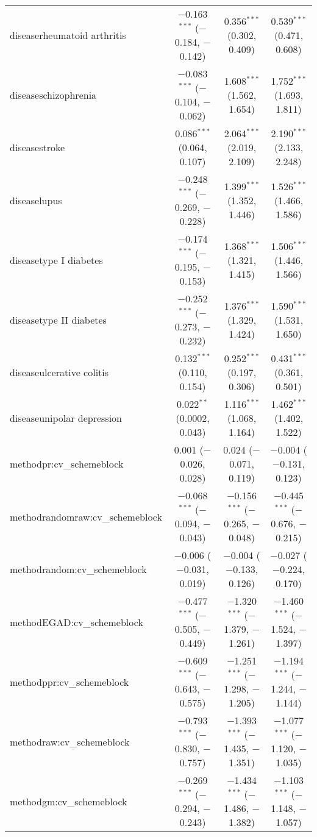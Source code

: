 \begin{table}[!htbp]
\begin{tabular}{@{\extracolsep{5pt}}lccc}
  diseaserheumatoid arthritis & $-$0.163$^{***}$ ($-$0.184, $-$0.142) & 0.356$^{***}$ (0.302, 0.409) & 0.539$^{***}$ (0.471, 0.608) \\ 
  diseaseschizophrenia & $-$0.083$^{***}$ ($-$0.104, $-$0.062) & 1.608$^{***}$ (1.562, 1.654) & 1.752$^{***}$ (1.693, 1.811) \\ 
  diseasestroke & 0.086$^{***}$ (0.064, 0.107) & 2.064$^{***}$ (2.019, 2.109) & 2.190$^{***}$ (2.133, 2.248) \\ 
  diseaselupus & $-$0.248$^{***}$ ($-$0.269, $-$0.228) & 1.399$^{***}$ (1.352, 1.446) & 1.526$^{***}$ (1.466, 1.586) \\ 
  diseasetype I diabetes & $-$0.174$^{***}$ ($-$0.195, $-$0.153) & 1.368$^{***}$ (1.321, 1.415) & 1.506$^{***}$ (1.446, 1.566) \\ 
  diseasetype II diabetes & $-$0.252$^{***}$ ($-$0.273, $-$0.232) & 1.376$^{***}$ (1.329, 1.424) & 1.590$^{***}$ (1.531, 1.650) \\ 
  diseaseulcerative colitis & 0.132$^{***}$ (0.110, 0.154) & 0.252$^{***}$ (0.197, 0.306) & 0.431$^{***}$ (0.361, 0.501) \\ 
  diseaseunipolar depression & 0.022$^{**}$ (0.0002, 0.043) & 1.116$^{***}$ (1.068, 1.164) & 1.462$^{***}$ (1.402, 1.522) \\ 
  methodpr:cv\_schemeblock & 0.001 ($-$0.026, 0.028) & 0.024 ($-$0.071, 0.119) & $-$0.004 ($-$0.131, 0.123) \\ 
  methodrandomraw:cv\_schemeblock & $-$0.068$^{***}$ ($-$0.094, $-$0.043) & $-$0.156$^{***}$ ($-$0.265, $-$0.048) & $-$0.445$^{***}$ ($-$0.676, $-$0.215) \\ 
  methodrandom:cv\_schemeblock & $-$0.006 ($-$0.031, 0.019) & $-$0.004 ($-$0.133, 0.126) & $-$0.027 ($-$0.224, 0.170) \\ 
  methodEGAD:cv\_schemeblock & $-$0.477$^{***}$ ($-$0.505, $-$0.449) & $-$1.320$^{***}$ ($-$1.379, $-$1.261) & $-$1.460$^{***}$ ($-$1.524, $-$1.397) \\ 
  methodppr:cv\_schemeblock & $-$0.609$^{***}$ ($-$0.643, $-$0.575) & $-$1.251$^{***}$ ($-$1.298, $-$1.205) & $-$1.194$^{***}$ ($-$1.244, $-$1.144) \\ 
  methodraw:cv\_schemeblock & $-$0.793$^{***}$ ($-$0.830, $-$0.757) & $-$1.393$^{***}$ ($-$1.435, $-$1.351) & $-$1.077$^{***}$ ($-$1.120, $-$1.035) \\ 
  methodgm:cv\_schemeblock & $-$0.269$^{***}$ ($-$0.294, $-$0.243) & $-$1.434$^{***}$ ($-$1.486, $-$1.382) & $-$1.103$^{***}$ ($-$1.148, $-$1.057) \\ 

\end{tabular}
\end{table}
